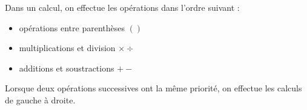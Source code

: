 Dans un calcul, on effectue les opérations dans l'ordre suivant :
\begin{itemize}
    \item opérations entre parenthèses\hskip30pt $()$
    \item multiplications et division\hskip35pt $\times\div$
    \item additions et soustractions\hskip35pt $+ -$
\end{itemize}
Lorsque deux opérations successives ont la même priorité, on effectue les
calculs de gauche à droite.